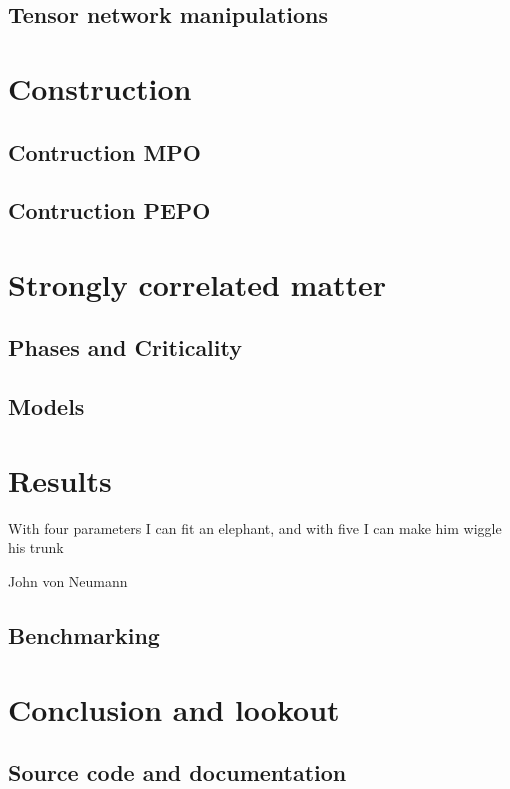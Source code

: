 \documentclass{book}
\begin{document}
\section{Tensor network manipulations}


\chapter{Construction}

\section{Contruction MPO}


\section{Contruction PEPO}


\chapter{Strongly correlated matter}

\section{Phases and Criticality} \label{sec:PhasesAndCrit}


\section{Models}


\chapter{Results}

\epigraph{With four parameters I can fit an elephant, and with five I can make him wiggle his trunk}{John von Neumann}

\section{Benchmarking}


\chapter{Conclusion and lookout}

\begin{appendices}
    \chapter{Source code and documentation}
\end{appendices}



\end{document}
